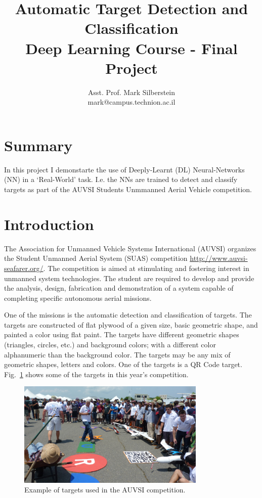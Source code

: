 \documentclass{article} %
\title{Automatic Target Detection and Classification \\
  Deep Learning Course -  Final Project}
\author{
  Asst. Prof. Mark Silberstein \\
  mark@campus.technion.ac.il\\
}
\begin{document}
\maketitle

\section{Summary}

In this project I demonstarte the use of Deeply-Learnt (DL)
Neural-Networks (NN) in a `Real-World' task. I.e. the NNs are trained to detect
and classify targets as part of the AUVSI Students Unmmanned Aerial Vehicle
competition.

\section{Introduction}

The Association for Unmanned Vehicle Systems International (AUVSI)
organizes the Student Unmanned Aerial System (SUAS) competition
\url{http://www.auvsi-seafarer.org/}. The competition is aimed  at
stimulating and fostering interest in unmanned system technologies.
The  student  are required  to  develop  and  provide  the  analysis,
design, fabrication and demonstration of a system capable of completing
specific autonomous aerial missions.

One of the missions is the automatic detection and classification of targets.
The targets are constructed of flat plywood of a given
size, basic geometric shape, and painted a color using flat paint.
The targets have different geometric shapes (triangles, circles, etc.)
and background colors; with a different color alphanumeric than the
background color.  The targets may be any mix of geometric shapes,
letters and colors. One of the targets is a 
QR Code target. Fig.~\ref{fig:targets} shows
some of the targets in this year's competition.
\begin{figure}[h]
    \centering
    \includegraphics[width=0.8\textwidth]{auvsi_targets}
    \caption{Example of targets used in the AUVSI competition.}
    \label{fig:targets}
\end{figure}
\end{document}
